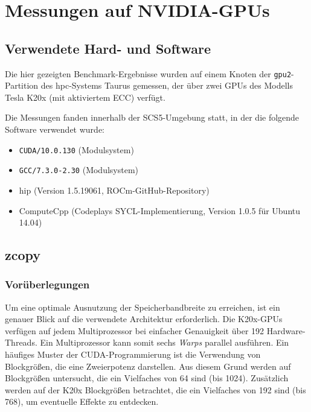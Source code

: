 \section{Messungen auf NVIDIA-GPUs}
\label{nvidia}

\subsection{Verwendete Hard- und Software}

Die hier gezeigten Benchmark-Ergebnisse wurden auf einem Knoten der
\texttt{gpu2}-Partition des \gls{hpc}-Systems Taurus gemessen, der über zwei
GPUs des Modells Tesla K20x (mit aktiviertem ECC) verfügt.

Die Messungen fanden innerhalb der SCS5-Umgebung statt, in der die folgende
Software verwendet wurde:

\begin{itemize}
    \item \texttt{CUDA/10.0.130} (Modulsystem)
    \item \texttt{GCC/7.3.0-2.30} (Modulsystem)
    \item \gls{hip} (Version 1.5.19061, ROCm-GitHub-Repository)
    \item ComputeCpp (Codeplays SYCL-Implementierung, Version 1.0.5 für Ubuntu
          14.04)
\end{itemize}

\subsection{zcopy}

\subsubsection{Vorüberlegungen}
\label{nvidia:zcopy:vorueberlegungen}

Um eine optimale Ausnutzung der Speicherbandbreite zu erreichen, ist ein genauer
Blick auf die verwendete Architektur erforderlich. Die K20x-GPUs verfügen auf
jedem Multiprozessor bei einfacher Genauigkeit über \num{192} Hardware-Threads.
Ein Multiprozessor kann somit sechs \textit{Warps} parallel ausführen. Ein
häufiges Muster der CUDA-Programmierung ist die Verwendung von Blockgrößen, die
eine Zweierpotenz darstellen. Aus diesem Grund werden auf Blockgrößen
untersucht, die ein Vielfaches von \num{64} sind (bis \num{1024}). Zusätzlich
werden auf der K20x Blockgrößen betrachtet, die ein Vielfaches von \num{192}
sind (bis \num{768}), um eventuelle Effekte zu entdecken.

